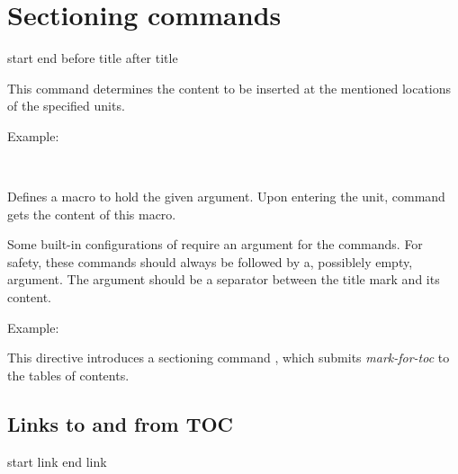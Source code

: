 \section{Sectioning commands}
{start}
{end}
{before title}
{after title}\EndDoc

This command determines the content to be inserted at the mentioned locations of the specified units. 

Example:

\begin{texsource}
{}  {}
{\chaptername ~\TitleMark
{}}
{}
\end{texsource}





Defines a macro  to hold the given argument. Upon
entering the unit,  command gets the content of this macro.

Some built-in configurations of \texfourht{} require an argument for the
 commands. For safety, these commands should
always be followed by a, possiblely empty, argument.  The argument
should be a separator between the title mark and its content.

Example:

\begin{texsource}
   {}{}
   {\TitleMark\space}    {}
\end{texsource}


 

This directive introduces a sectioning command , which submits
\textit{mark-for-toc} to the tables of contents.

\begin{texsource}
\NewSection\X {\thec}
{}{} 
{\ifvmode\IgnorePar\fi\EndP{}\TitleMark\space}
{}
\end{texsource}

\subsection{Links to and from TOC}
 {start link} {end link}\EndDoc


